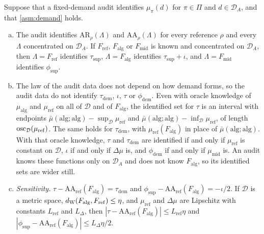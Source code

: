 \begin{proposition}\label{prop:audit-scope}
Suppose that a fixed-demand audit identifies $\mu_\pi(d)$ for $\pi\in\Pi$ and $d\in\mathcal D_A$, and that \cref{asm:demand} holds.
\begin{enumerate}[(a)]
  \item The audit identifies $\mathrm{AR}_\rho(\Lambda)$ and $\mathrm{AA}_\rho(\Lambda)$ for every reference $\rho$ and every $\Lambda$ concentrated on $\mathcal D_A$. If $F_{\mathrm{ref}}$, $F_{\mathrm{alg}}$ or $F_{\mathrm{mid}}$ is known and concentrated on $\mathcal D_A$, then $\Lambda=F_{\mathrm{ref}}$ identifies $\tau_{\mathrm{sup}}$, $\Lambda=F_{\mathrm{alg}}$ identifies $\tau_{\mathrm{sup}}+\iota$, and $\Lambda=F_{\mathrm{mid}}$ identifies $\phi_{\mathrm{sup}}$.
  \item The law of the audit data does not depend on how demand forms, so the audit data do not identify $\tau_{\mathrm{dem}}$, $\iota$, $\tau$ or $\phi_{\mathrm{dem}}$. Even with oracle knowledge of $\mu_{\mathrm{alg}}$ and $\mu_{\mathrm{ref}}$ on all of $\mathcal D$ and of $F_{\mathrm{alg}}$, the identified set for $\tau$ is an interval with endpoints $\bar\mu(\mathrm{alg};\mathrm{alg})-\sup_{\mathcal D}\mu_{\mathrm{ref}}$ and $\bar\mu(\mathrm{alg};\mathrm{alg})-\inf_{\mathcal D}\mu_{\mathrm{ref}}$, of length $\operatorname{osc}_{\mathcal D}(\mu_{\mathrm{ref}})$. The same holds for $\tau_{\mathrm{dem}}$, with $\mu_{\mathrm{ref}}(F_{\mathrm{alg}})$ in place of $\bar\mu(\mathrm{alg};\mathrm{alg})$. With that oracle knowledge, $\tau$ and $\tau_{\mathrm{dem}}$ are identified if and only if $\mu_{\mathrm{ref}}$ is constant on $\mathcal D$, $\iota$ if and only if $\Delta\mu$ is, and $\phi_{\mathrm{dem}}$ if and only if $\mu_{\mathrm{mid}}$ is. An audit knows these functions only on $\mathcal D_A$ and does not know $F_{\mathrm{alg}}$, so its identified sets are wider still.
  \item \emph{Sensitivity.} $\tau-\mathrm{AA}_{\mathrm{ref}}(F_{\mathrm{alg}})=\tau_{\mathrm{dem}}$ and $\phi_{\mathrm{sup}}-\mathrm{AA}_{\mathrm{ref}}(F_{\mathrm{alg}})=-\iota/2$. If $\mathcal D$ is a metric space, $d_{\mathrm{W}}(F_{\mathrm{alg}},F_{\mathrm{ref}})\le\eta$, and $\mu_{\mathrm{ref}}$ and $\Delta\mu$ are Lipschitz with constants $L_{\mathrm{ref}}$ and $L_\Delta$, then $|\tau-\mathrm{AA}_{\mathrm{ref}}(F_{\mathrm{alg}})|\le L_{\mathrm{ref}}\eta$ and $|\phi_{\mathrm{sup}}-\mathrm{AA}_{\mathrm{ref}}(F_{\mathrm{alg}})|\le L_\Delta\eta/2$.
\end{enumerate}
\end{proposition}

